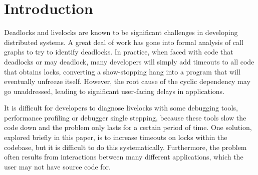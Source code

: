 \section{Introduction} \label{sec:intro}
%

%

Deadlocks and livelocks are known to be significant challenges in developing distributed systems.
A great deal of work has gone into formal analysis of call graphs to try to identify deadlocks.
In practice, when faced with code that deadlocks or may deadlock, many developers will simply add timeouts to all code that obtains locks,
converting a show-stopping hang into a program that will eventually unfreeze itself.
However, the root cause of the cyclic dependency may go unaddressed, leading to significant user-facing delays in applications.

It is difficult for developers to diagnose livelocks with some debugging tools, \eg performance profiling or debugger single stepping,
because these tools slow the code down and the problem only lasts for a certain period of time.
One solution, explored briefly in this paper, is to increase timeouts on locks within the codebase,
but it is difficult to do this systematically.
Furthermore, the problem often results from interactions between many different applications,
which the user may not have source code for.
